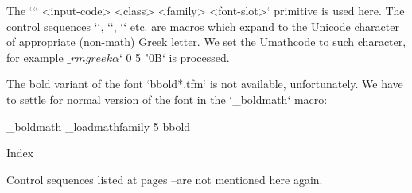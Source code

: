\addto{}
\endtt
%
The \x`\Umathcode`` <input-code> <class> <family> <font-slot>` primitive is used
here. The control sequences `\alpha`, `\beta`, `\gamma` etc. are macros which expand
to the Unicode character of appropriate (non-math) Greek letter. We set the
Umathcode to such character, for example
$\_rmgreek\alpha$` 0 5 "0B` is processed.

The bold variant of the font `bbold*.tfm` is not available, unfortunately.
We have to settle for normal version of the font in the `\_boldmath` macro:

\begtt \typosize[10/12]
   \addto \_boldmath {\_loadmathfamily 5 bbold }
\endtt

\sec Index

Control sequences listed at pages \pgref[listA]--\pgref[listB] are not
mentioned here again.

\makeindex
\endmulti

\bye
